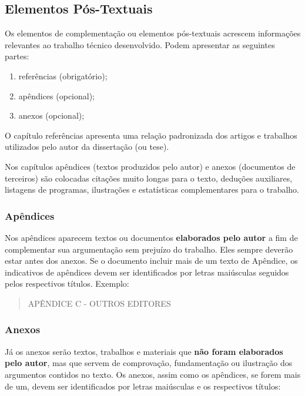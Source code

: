 \documentclass[repeatfields,xlists,xpacks,oneside,yearsonly]{ufrgscca}
\begin{document}
    \subsection{Elementos Pós-Textuais}

    Os elementos de complementação ou elementos pós-textuais acrescem
    informações relevantes ao trabalho técnico desenvolvido. Podem apresentar as
    seguintes partes:

    \begin{enumerate}
        \item referências (obrigatório);
        \item apêndices (opcional);
        \item anexos (opcional);
    \end{enumerate}

    O capítulo referências apresenta uma relação padronizada dos artigos e
    trabalhos utilizados pelo autor da dissertação (ou tese).

    Nos capítulos apêndices (textos produzidos pelo autor) e anexos (documentos
    de terceiros) são colocadas citações muito longas para o texto, deduções
    auxiliares, listagens de programas, ilustrações e estatísticas
    complementares para o trabalho.

    \subsubsection{Apêndices}

    Nos apêndices aparecem textos ou documentos {\bf elaborados pelo autor}  a
    fim de complementar sua argumentação sem prejuízo do trabalho. Eles sempre
    deverão estar antes dos anexos. Se o documento incluir mais de um texto de
    Apêndice, os indicativos de apêndices devem ser identificados por letras
    maiúsculas seguidos pelos respectivos títulos. Exemplo:\\

    \begin{quote}APÊNDICE C  - OUTROS EDITORES\\\end{quote}

    \subsubsection{Anexos}

    Já os anexos serão textos, trabalhos e materiais que {\bf não foram
        elaborados pelo autor}, mas que servem de comprovação, fundamentação ou
    ilustração dos argumentos contidos no texto. Os anexos, assim como os
    apêndices, se forem mais de um, devem ser identificados por letras
    maiúsculas e os respectivos títulos:\\
\end{document}
